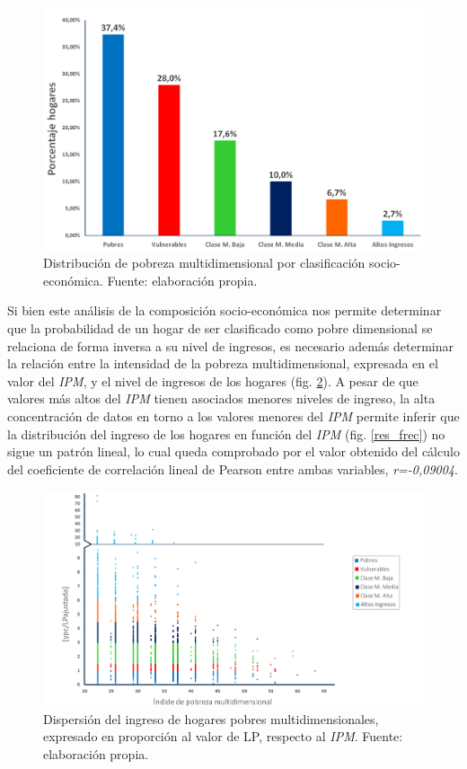 \documentclass[12pt,letterpaper,spanish]{article}
\begin{document}
\begin{figure}[!]
    \centering
    \includegraphics[height=8 cm]{Max/tipos_prop.png}
    \caption{Distribución de pobreza multidimensional por clasificación socio-económica. Fuente: elaboración propia.}
    \label{distribucion_relativa}
\end{figure}


Si bien este análisis de la composición socio-económica nos permite determinar que la probabilidad de un hogar de ser clasificado como pobre dimensional se relaciona de forma inversa a su nivel de ingresos, es necesario además determinar la relación entre la intensidad de la pobreza multidimensional, expresada en el valor del \textit{IPM}, y el nivel de ingresos de los hogares (fig. \ref{scatter_general_quiebre}). A pesar de que valores más altos del \textit{IPM} tienen asociados menores niveles de ingreso, la alta concentración de datos en torno a los valores menores del \textit{IPM} permite inferir que la distribución del ingreso de los hogares en función del \textit{IPM} (fig. \ref{res_frec}) no sigue un patrón lineal, lo cual queda comprobado por el valor obtenido del cálculo del coeficiente de correlación lineal de Pearson entre ambas variables,  \textit{r=-0,09004}.


\begin{figure}[!]
    \centering
    \includegraphics[width=\textwidth]{Max/scatter_General_quiebre.png}
    \caption{Dispersión del ingreso de hogares pobres multidimensionales, expresado en proporción al valor de LP, respecto al \textit{IPM}. Fuente: elaboración propia.}
    \label{scatter_general_quiebre}
\end{figure}
\end{document}
